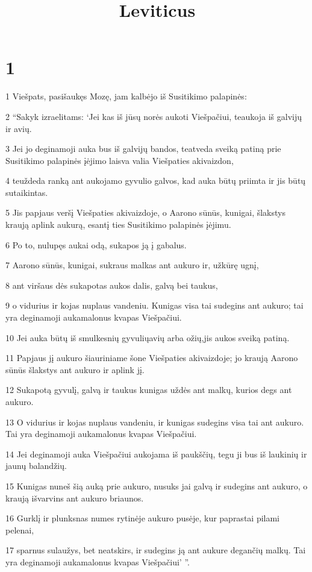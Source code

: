 

\title{Leviticus}

\chapter{1}


\par 1 Viešpats, pasišaukęs Mozę, jam kalbėjo iš Susitikimo palapinės: 
\par 2 “Sakyk izraelitams: ‘Jei kas iš jūsų norės aukoti Viešpačiui, teaukoja iš galvijų ir avių. 
\par 3 Jei jo deginamoji auka bus iš galvijų bandos, teatveda sveiką patiną prie Susitikimo palapinės įėjimo laisva valia Viešpaties akivaizdon, 
\par 4 teuždeda ranką ant aukojamo gyvulio galvos, kad auka būtų priimta ir jis būtų sutaikintas. 
\par 5 Jis papjaus veršį Viešpaties akivaizdoje, o Aarono sūnūs, kunigai, šlakstys kraują aplink aukurą, esantį ties Susitikimo palapinės įėjimu. 
\par 6 Po to, nulupęs aukai odą, sukapos ją į gabalus. 
\par 7 Aarono sūnūs, kunigai, sukraus malkas ant aukuro ir, užkūrę ugnį, 
\par 8 ant viršaus dės sukapotas aukos dalis, galvą bei taukus, 
\par 9 o vidurius ir kojas nuplaus vandeniu. Kunigas visa tai sudegins ant aukuro; tai yra deginamoji auka­malonus kvapas Viešpačiui. 
\par 10 Jei auka būtų iš smulkesnių gyvulių­avių arba ožių,­jis aukos sveiką patiną. 
\par 11 Papjaus jį aukuro šiauriniame šone Viešpaties akivaizdoje; jo kraują Aarono sūnūs šlakstys ant aukuro ir aplink jį. 
\par 12 Sukapotą gyvulį, galvą ir taukus kunigas uždės ant malkų, kurios degs ant aukuro. 
\par 13 O vidurius ir kojas nuplaus vandeniu, ir kunigas sudegins visa tai ant aukuro. Tai yra deginamoji auka­malonus kvapas Viešpačiui. 
\par 14 Jei deginamoji auka Viešpačiui aukojama iš paukščių, tegu ji bus iš laukinių ir jaunų balandžių. 
\par 15 Kunigas nuneš šią auką prie aukuro, nusuks jai galvą ir sudegins ant aukuro, o kraują išvarvins ant aukuro briaunos. 
\par 16 Gurklį ir plunksnas numes rytinėje aukuro pusėje, kur paprastai pilami pelenai, 
\par 17 sparnus sulaužys, bet neatskirs, ir sudegins ją ant aukure degančių malkų. Tai yra deginamoji auka­malonus kvapas Viešpačiui’ ”.


